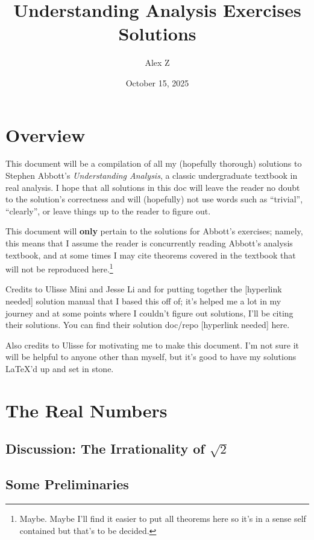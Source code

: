 \documentclass[12pt]{article}
\title{Understanding Analysis Exercises Solutions}
\author{Alex Z}
\date{October 15, 2025} %
\theoremstyle{definition}
\begin{document}
 
\maketitle
\newpage


\section*{Overview}

This document will be a compilation of all my (hopefully thorough) solutions to Stephen Abbott's \textit{Understanding Analysis}, a classic undergraduate textbook in real analysis. I hope that all solutions in this doc will leave the reader no doubt to the solution's correctness and will (hopefully) not use words such as ``trivial'', ``clearly'', or leave things up to the reader to figure out.

This document will \textbf{only} pertain to the solutions for Abbott's exercises; namely, this means that I assume the reader is concurrently reading Abbott's analysis textbook, and at some times I may cite theorems covered in the textbook that will not be reproduced here.\footnote{Maybe. Maybe I'll find it easier to put all theorems here so it's in a sense self contained but that's to be decided.}

Credits to Ulisse Mini and Jesse Li and for putting together the [hyperlink needed] solution manual that I based this off of; it's helped me a lot in my journey and at some points where I couldn't figure out solutions, I'll be citing their solutions. You can find their solution doc/repo [hyperlink needed] here.

Also credits to Ulisse for motivating me to make this document. I'm not sure it will be helpful to anyone other than myself, but it's good to have my solutions \LaTeX'd up and set in stone.

\newpage


\tableofcontents
\newpage 




\section{The Real Numbers}

\subsection{Discussion: The Irrationality of \texorpdfstring{\( \sqrt{2} \)}{Root 2}} 





\subsection{Some Preliminaries}




  
\end{document}
